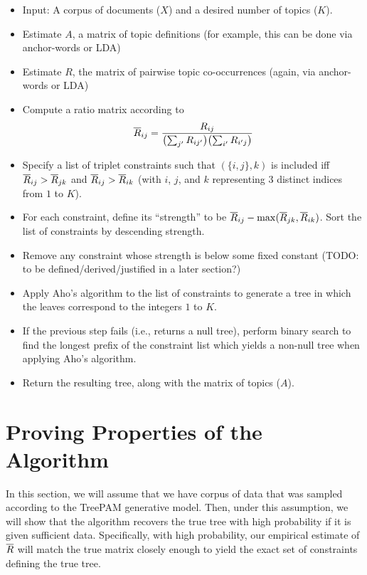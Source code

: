 \documentclass{article}
\theoremstyle{definition}
\begin{document}
\begin{itemize}
  \item Input: A corpus of documents ($X$) and a desired number of topics ($K$).
  \item Estimate $A$, a matrix of topic definitions (for example, this can be done via anchor-words or LDA)
  \item Estimate $R$, the matrix of pairwise topic co-occurrences (again, via anchor-words or LDA)
  \item Compute a ratio matrix according to
  \begin{align}
  \overline{R}_{ij} = \frac{R_{ij}}{ \bigl( \sum_{j'} R_{ij'} \bigr) \bigl( \sum_{i'} R_{i'j} \bigr) }
  \end{align}
  \item Specify a list of triplet constraints such that $(\{i, j\}, k)$ is included iff $\overline{R}_{ij} > \overline{R}_{jk}$ and $\overline{R}_{ij} > \overline{R}_{ik}$ (with $i$, $j$, and $k$ representing 3 distinct indices from $1$ to $K$).
  \item For each constraint, define its ``strength'' to be $\overline{R}_{ij} - \max(\overline{R}_{jk}, \overline{R}_{ik})$.
        Sort the list of constraints by descending strength.
  \item Remove any constraint whose strength is below some fixed constant (TODO: to be defined/derived/justified in a later section?)
  \item Apply Aho's algorithm to the list of constraints to generate a tree in which the leaves correspond to the integers $1$ to $K$.
  \item If the previous step fails (i.e., returns a null tree), perform binary search to find the longest prefix of the constraint list which yields a non-null tree when applying Aho's algorithm.
  \item Return the resulting tree, along with the matrix of topics ($A$).
\end{itemize}


\section{Proving Properties of the Algorithm}

In this section, we will assume that we have corpus of data that was sampled according to the TreePAM generative model.
Then, under this assumption, we will show that the algorithm recovers the true tree with high probability if it is given sufficient data.
Specifically, with high probability, our empirical estimate of $\overline{R}$ will match the true matrix closely enough to yield the exact set of constraints defining the true tree.
\end{document}
